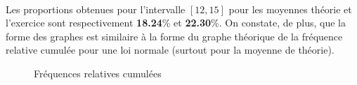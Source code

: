 \documentclass[a4paper,11pt]{article}
\begin{document}
\paragraph{}
Les proportions obtenues pour l'intervalle $[12, 15]$ pour les moyennes théorie et l'exercice sont respectivement \textbf{18.24}\% et \textbf{22.30}\%. On constate, de plus, que la forme des graphes est similaire à la forme du graphe théorique de la fréquence relative cumulée pour une loi normale (surtout pour la moyenne de théorie).

\begin{figure}
	\caption{Fréquences relatives cumulées}
\end{figure}
\end{document}
